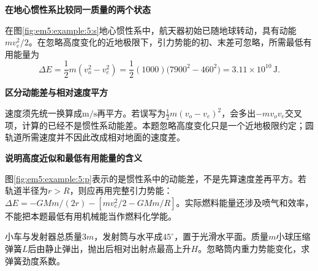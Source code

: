 \begin{solution}\textbf{在地心惯性系比较同一质量的两个状态}\par\nobreak
在图\ref{fig:em5:example:5:s}地心惯性系中，航天器初始已随地球转动，具有动能$mv_e^2/2$。在忽略高度变化的近地极限下，引力势能的初、末差可忽略，所需最低有用能量为
\[\Delta E=\frac12m(v_o^2-v_e^2)=\frac12(1000)\bigl(7900^2-460^2\bigr)=\boxed{3.11\times10^{10}\,\mathrm J}.\]



\par\medskip{}\noindent\textbf{区分动能差与相对速度平方}\par\nobreak
速度须先统一换算成$\mathrm{m/s}$再平方。若误写为$\tfrac12m(v_o-v_e)^2$，会多出$-mv_ov_e$交叉项，计算的已经不是惯性系动能差。本题忽略高度变化只是一个近地极限约定；圆轨道所需速度并不因此改成相对地面的速度差。



\par\medskip{}\noindent\textbf{说明高度近似和最低有用能量的含义}\par\nobreak
图\ref{fig:em5:example:5:p}表示的是惯性系中的动能差，不是先算速度差再平方。若轨道半径为$r>R$，则应再用完整引力势能：$\Delta E=-GMm/(2r)-[mv_e^2/2-GMm/R]$。实际燃料能量还涉及喷气和效率，不能把本题最低有用机械能当作燃料化学能。\end{solution}
\begin{question}\begin{example}[自由小车上的弹簧发射器]\label{em5:example:6}
小车与发射器总质量$3m$，发射筒与水平成$45^\circ$，置于光滑水平面。质量$m$小球压缩弹簧$L$后由静止弹出，抛出后相对出射点最高上升$H$。忽略筒内重力势能变化，求弹簧劲度系数。
\end{example}
\end{question}
